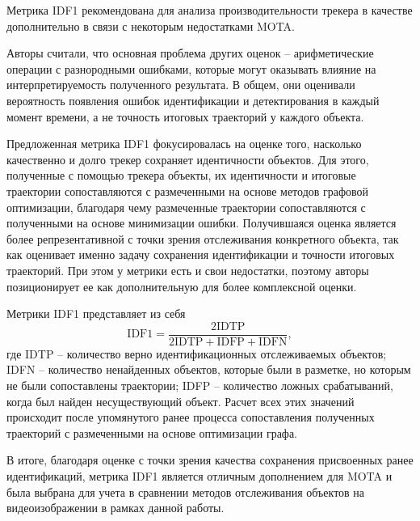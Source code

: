 Метрика IDF1 \cite{ristani2016performance} рекомендована \cite{du2024exploring} для анализа производительности трекера в качестве дополнительно в связи с некоторым недостатками MOTA.

Авторы считали, что основная проблема других оценок -- арифметические операции с разнородными ошибками, которые могут оказывать влияние на интерпретируемость полученного результата. В общем, они оценивали вероятность появления ошибок идентификации и детектирования в каждый момент времени, а не точность итоговых траекторий у каждого объекта. 

Предложенная метрика IDF1 фокусировалась на оценке того, насколько качественно и долго трекер сохраняет идентичности объектов. Для этого, полученные с помощью трекера объекты, их идентичности и итоговые траектории сопоставляются с размеченными на основе методов графовой оптимизации, благодаря чему размеченные траектории сопоставляются с полученными на основе минимизации ошибки. Получившаяся оценка является более репрезентативной с точки зрения отслеживания конкретного объекта, так как оценивает именно задачу сохранения идентификации и точности итоговых траекторий.  
При этом у метрики есть и свои недостатки, поэтому авторы позиционирует ее как дополнительную для более комплексной оценки. 

Метрики IDF1 представляет из себя
\begin{equation}
    \label{eq:idf1}
    \text{IDF1} = \frac{2 \text{IDTP}}{2\text{IDTP} + \text{IDFP} + \text{IDFN}},
\end{equation}
где IDTP -- количество верно идентификационных отслеживаемых объектов; IDFN -- количество ненайденных объектов, которые были в разметке, но которым не были сопоставлены траектории; IDFP -- количество ложных срабатываний, когда был найден несуществующий объект. 
Расчет всех этих значений происходит после упомянутого ранее процесса сопоставления полученных траекторий с размеченными на основе оптимизации графа. 


В итоге, благодаря оценке с точки зрения качества сохранения присвоенных ранее идентификаций, метрика IDF1 является отличным дополнением для MOTA и была выбрана для учета в сравнении методов отслеживания объектов на видеоизображении в рамках данной работы.